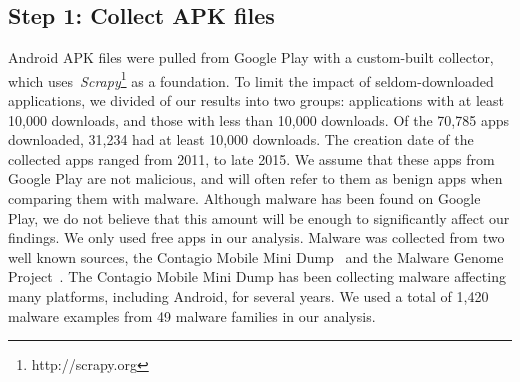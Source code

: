 \documentclass{sig-alternate-05-2015}
\begin{document}



\label{sec: collection}
\subsection{Step 1: Collect APK files}

Android APK files were pulled from Google Play with a custom-built collector, which uses~\emph{Scrapy}\footnote{http://scrapy.org} as a foundation. To limit the impact of seldom-downloaded applications, we divided of our results into two groups: applications with at least 10,000 downloads, and those with less than 10,000 downloads. Of the 70,785 apps downloaded, 31,234 had at least 10,000 downloads. The creation date of the collected apps ranged from 2011, to late 2015. We assume that these apps from Google Play are not malicious, and will often refer to them as benign apps when comparing them with malware. Although malware has been found on Google Play, we do not believe that this amount will be enough to significantly affect our findings. We only used free apps in our analysis. Malware was collected  from two well known sources, the Contagio Mobile Mini Dump~\cite{contagio_url} and the Malware Genome Project~\cite{Zhou:2012:DAM:2310656.2310710}. The Contagio Mobile Mini Dump has been collecting malware affecting many platforms, including Android, for several years. We used a total of 1,420 malware examples from 49 malware families in our analysis.
\end{document}

